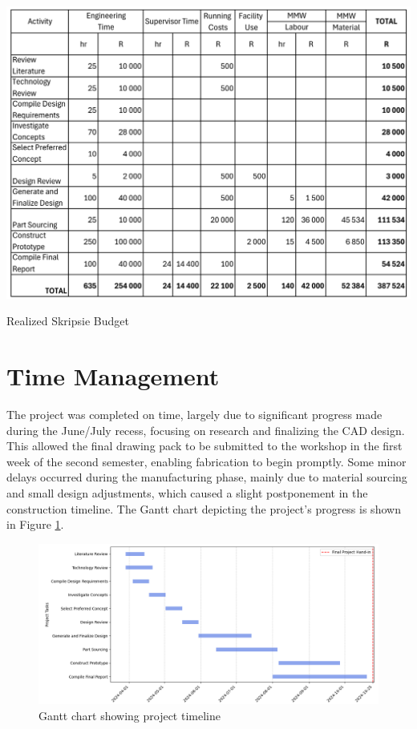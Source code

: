 \begin{table}[ht]
    \centering
    \includegraphics[width=1\linewidth]{tables/skripsie_budget_2.pdf}
    \caption{Realized Skripsie Budget}
\end{table}

\section{Time Management}

The project was completed on time, largely due to significant progress made during the June/July recess, focusing on research and finalizing the CAD design. This allowed the final drawing pack to be submitted to the workshop in the first week of the second semester, enabling fabrication to begin promptly. Some minor delays occurred during the manufacturing phase, mainly due to material sourcing and small design adjustments, which caused a slight postponement in the construction timeline. The Gantt chart depicting the project's progress is shown in Figure \ref{fig:gantt_final}.

\begin{figure}[ht]
    \centering
    \includegraphics[width=1\linewidth]{figs/gantt_final.png}
    \caption{Gantt chart showing project timeline}
    \label{fig:gantt_final}
\end{figure}

